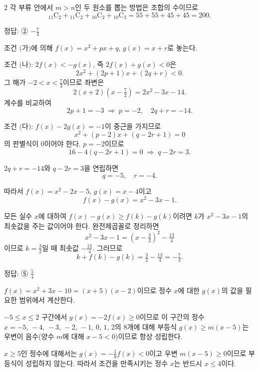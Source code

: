 \documentclass[10pt]{article}
\begin{document}
\begin{multicols}{2}
각 부류 안에서 $m > n$인 두 원소를 뽑는 방법은 조합의 수이므로
\[ {}_{11}\mathrm{C}_2 + {}_{11}\mathrm{C}_2 + {}_{10}\mathrm{C}_2 + {}_{10}\mathrm{C}_2 = 55 + 55 + 45 + 45 = 200. \]

\begin{answerbox}정답: ② $-\tfrac{7}{4}$\end{answerbox}

조건 $(\!$가$)$에 의해 $f(x) = x^2 + px + q$, $g(x) = x + r$로 놓는다.

조건 $(\!$나$)$: $2f(x) < -g(x)$, 즉 $2f(x) + g(x) < 0$은
\[ 2x^2 + (2p+1)x + (2q + r) < 0. \]
그 해가 $-2 < x < \tfrac{7}{2}$이므로 좌변은
\[ 2(x + 2)\left(x - \tfrac{7}{2}\right) = 2x^2 - 3x - 14. \]
계수를 비교하여
\[ 2p + 1 = -3 \;\Rightarrow\; p = -2,\quad 2q + r = -14. \]

조건 $(\!$다$)$: $f(x) - 2g(x) = -1$이 중근을 가지므로
\[ x^2 + (p - 2)x + (q - 2r + 1) = 0 \]
의 판별식이 $0$이어야 한다. $p = -2$이므로
\[ 16 - 4(q - 2r + 1) = 0 \;\Rightarrow\; q - 2r = 3. \]

$2q + r = -14$와 $q - 2r = 3$을 연립하면
\[ q = -5,\quad r = -4. \]

따라서 $f(x) = x^2 - 2x - 5$, $g(x) = x - 4$이고
\[ f(x) - g(x) = x^2 - 3x - 1. \]

모든 실수 $x$에 대하여 $f(x) - g(x) \ge f(k) - g(k)$이려면 $k$가 $x^2 - 3x - 1$의 최솟값을 주는 값이어야 한다. 완전제곱꼴로 정리하면
\[ x^2 - 3x - 1 = \left(x - \tfrac{3}{2}\right)^2 - \tfrac{13}{4} \]
이므로 $k = \tfrac{3}{2}$일 때 최솟값 $-\tfrac{13}{4}$. 그러므로
\[ k + f(k) - g(k) = \tfrac{3}{2} - \tfrac{13}{4} = -\tfrac{7}{4}. \]

\begin{answerbox}정답: ⑤ $\tfrac{5}{4}$\end{answerbox}

$f(x) = x^2 + 3x - 10 = (x + 5)(x - 2)$이므로 정수 $x$에 대한 $g(x)$의 값을 필요한 범위에서 계산한다.

$-5 \le x \le 2$ 구간에서 $g(x) = -2 f(x) \ge 0$이므로 이 구간의 정수 $x = -5,\, -4,\, -3,\, -2,\, -1,\, 0,\, 1,\, 2$의 $8$개에 대해 부등식 $g(x) \ge m(x - 5)$는 우변이 음수(양수 $m$에 대해 $x - 5 < 0$)이므로 항상 성립한다.

$x \ge 5$인 정수에 대해서는 $g(x) = -\tfrac{1}{8} f(x) < 0$이고 우변 $m(x-5) \ge 0$이므로 부등식이 성립하지 않는다. 따라서 조건을 만족시키는 정수 $x$는 반드시 $x \le 4$이다.


\end{multicols}
\end{document}
